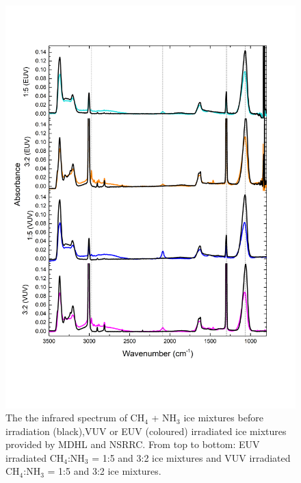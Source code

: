 \begin{figure}
\centering
\includegraphics[width=\textwidth]{figures/chapter3/EUV_widerange.png}
\caption{The the infrared spectrum of CH$_4$ + NH$_3$ ice mixtures before irradiation (black),VUV or EUV (coloured) irradiated ice mixtures provided by MDHL and NSRRC. From top to bottom: EUV irradiated CH$_4$:NH$_3$ = 1:5 and 3:2 ice mixtures and VUV irradiated CH$_4$:NH$_3$ = 1:5 and 3:2 ice mixtures.}
\label{fig:NSRRC_MDHL_IR}
\end{figure}

